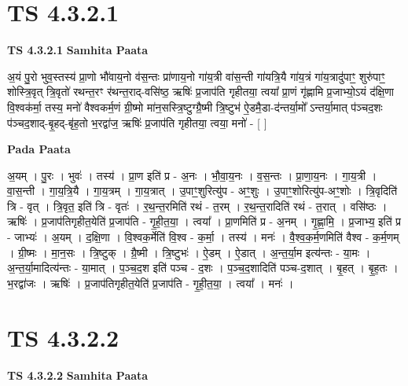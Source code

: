 \documentclass[17pt]{extarticle}
\begin{document}

\section{ TS 4.3.2.1 }

\textbf{TS 4.3.2.1 } \newline
\textbf{Samhita Paata} \newline

अ॒यं पु॒रो भुव॒स्तस्य॑ प्रा॒णो भौ॑वाय॒नो व॑स॒न्तः प्रा॑णाय॒नो गा॑य॒त्री वा॑स॒न्ती गा॑यत्रि॒यै गा॑य॒त्रं गा॑य॒त्रादु॑पाꣳ॒॒ शुरु॑पाꣳ॒॒ शोस्त्रि॒वृत् त्रि॒वृतो॑ रथन्त॒रꣳ र॑थन्त॒राद्-वसि॑ष्ठ॒ ऋषिः॑ प्र॒जाप॑ति गृहीतया॒ त्वया᳚ प्रा॒णं गृ॑ह्णामि प्र॒जाभ्यो॒ऽयं द॑क्षि॒णा वि॒श्वक॑र्मा॒ तस्य॒ मनो॑ वैश्वकर्म॒णं ग्री॒ष्मो मा॑न॒सस्त्रि॒ष्टुग्ग्रै॒ष्मी त्रि॒ष्टुभ॑ ऐ॒डमै॒डा-द॑न्तर्या॒मो᳚ ऽन्तर्या॒मात् प॑ञ्चद॒शः प॑ञ्चद॒शाद्-बृ॒हद्-बृ॑ह॒तो भ॒रद्वा॑ज॒ ऋषिः॑ प्र॒जाप॑ति गृहीतया॒ त्वया॒ मनो॑ - [  ] \newline

\textbf{Pada Paata} \newline

अ॒यम् । पु॒रः । भुवः॑ । तस्य॑ । प्रा॒ण इति॑ प्र - अ॒नः । भौ॒वा॒य॒नः । व॒स॒न्तः । प्रा॒णा॒य॒नः । गा॒य॒त्री । वा॒स॒न्ती । गा॒य॒त्रि॒यै । गा॒य॒त्रम् । गा॒य॒त्रात् । उ॒पाꣳ॒॒शुरित्यु॑प - अꣳ॒॒शुः । उ॒पाꣳ॒॒शोरित्यु॑प-अꣳ॒॒शोः । त्रि॒वृदिति॑ त्रि - वृत् । त्रि॒वृत॒ इति॑ त्रि - वृतः॑ । र॒थ॒न्त॒रमिति॑ रथं - त॒रम् । र॒थ॒न्त॒रादिति॑ रथं - त॒रात् । वसि॑ष्ठः । ऋषिः॑ । प्र॒जाप॑तिगृहीत॒येति॑ प्र॒जाप॑ति - गृ॒ही॒त॒या॒ । त्वया᳚ । प्रा॒णमिति॑ प्र - अ॒नम् । गृ॒ह्णा॒मि॒ । प्र॒जाभ्य॒ इति॑ प्र - जाभ्यः॑ । अ॒यम् । द॒क्षि॒णा । वि॒श्वक॒र्मेति॑ वि॒श्व - क॒र्मा॒ । तस्य॑ । मनः॑ । वै॒श्व॒क॒र्म॒णमिति॑ वैश्व - क॒र्म॒णम् । ग्री॒ष्मः । मा॒न॒सः । त्रि॒ष्टुक् । ग्रै॒ष्मी । त्रि॒ष्टुभः॑ । ऐ॒डम् । ऐ॒डात् । अ॒न्त॒र्या॒म इत्य॑न्तः - या॒मः । अ॒न्त॒र्या॒मादित्य॑न्तः - या॒मात् । प॒ञ्च॒द॒श इति॑ पञ्च - द॒शः । प॒ञ्च॒द॒शादिति॑ पञ्च-द॒शात् । बृ॒हत् । बृ॒ह॒तः । भ॒रद्वा॑जः । ऋषिः॑ । प्र॒जाप॑तिगृहीत॒येति॑ प्र॒जाप॑ति - गृ॒ही॒त॒या॒ । त्वया᳚ । मनः॑ ।  \newline





\section{ TS 4.3.2.2 }

\textbf{TS 4.3.2.2 } \newline
\textbf{Samhita Paata} \newline
\end{document}

